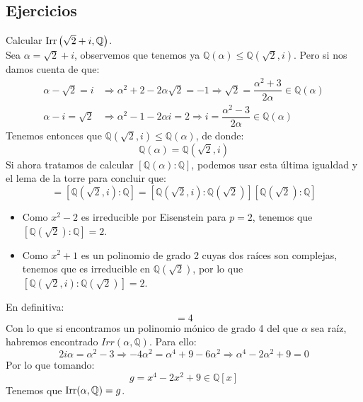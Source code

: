 \subsection{Ejercicios}
\begin{ejercicio}
    Calcular $\operatorname{Irr}\left(\sqrt{2}+i,\mathbb{Q}\right)$.\\ 

    \noindent
    Sea $\alpha = \sqrt{2}+i$, observemos que tenemos ya $\mathbb{Q}(\alpha)\leq \mathbb{Q}(\sqrt{2},i)$. Pero si nos damos cuenta de que:
    \begin{align*}
        \alpha-\sqrt{2} = i &\Longrightarrow \alpha^2+2-2\alpha\sqrt{2} = -1 \Longrightarrow \sqrt{2} = \dfrac{\alpha^2+3}{2\alpha} \in \mathbb{Q}(\alpha) \\
        \alpha-i = \sqrt{2} &\Longrightarrow \alpha^2-1-2\alpha i = 2 \Longrightarrow i = \dfrac{\alpha^2-3}{2\alpha}\in \mathbb{Q}(\alpha)
    \end{align*}
    Tenemos entonces que $\mathbb{Q}(\sqrt{2},i)\leq \mathbb{Q}(\alpha)$, de donde:
    \begin{equation*}
        \mathbb{Q}(\alpha) = \mathbb{Q}(\sqrt{2},i)
    \end{equation*}
    Si ahora tratamos de calcular $[\mathbb{Q}(\alpha):\mathbb{Q}]$, podemos usar esta última igualdad y el lema de la torre para concluir que:
    \begin{equation*}
        [\mathbb{Q}(\alpha):\mathbb{Q}] = [\mathbb{Q}(\sqrt{2},i):\mathbb{Q}] = [\mathbb{Q}(\sqrt{2},i):\mathbb{Q}(\sqrt{2})][\mathbb{Q}(\sqrt{2}):\mathbb{Q}]
    \end{equation*}
    \begin{itemize}
        \item Como $x^2-2$ es irreducible por Eisenstein para $p=2$, tenemos que \newline $[\mathbb{Q}(\sqrt{2}):\mathbb{Q}]=2$.
        \item Como $x^2+1$ es un polinomio de grado 2 cuyas dos raíces son complejas, tenemos que es irreducible en $\mathbb{Q}(\sqrt{2})$, por lo que $[\mathbb{Q}(\sqrt{2},i):\mathbb{Q}(\sqrt{2})]=2$.
    \end{itemize}
    En definitiva:
    \begin{equation*}
        [\mathbb{Q}(\alpha):\mathbb{Q}] = 4
    \end{equation*}
    Con lo que si encontramos un polinomio mónico de grado 4 del que $\alpha$ sea raíz, habremos encontrado $Irr(\alpha,\mathbb{Q})$. Para ello:
    \begin{equation*}
        2i\alpha = \alpha^2 -3 \Longrightarrow -4\alpha^2 = \alpha^4 + 9 - 6\alpha^2 \Longrightarrow \alpha^4 -2\alpha^2+9 = 0
    \end{equation*}
    Por lo que tomando:
    \begin{equation*}
        g = x^4-2x^2+9 \in \mathbb{Q}[x]
    \end{equation*}
    Tenemos que $\operatorname{Irr}(\alpha,\mathbb{Q}) = g$.
\end{ejercicio}

